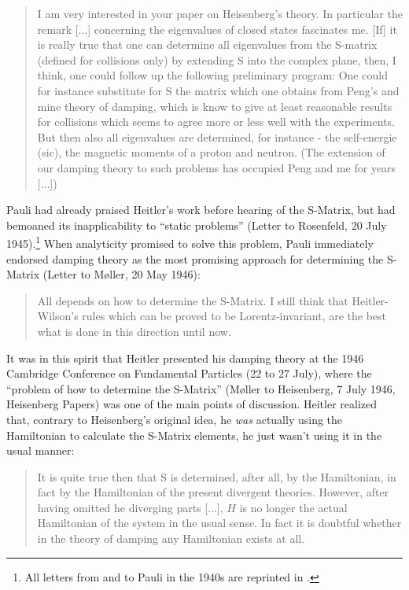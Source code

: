 \documentclass[12pt]{article}
\begin{document}
\begin{quote}
I am very interested in your paper on Heisenberg's theory. In particular the remark [...] concerning the eigenvalues of closed states fascinates me. [If] it is really true that one can determine all eigenvalues from the S-matrix (defined for collisions only) by extending S into the complex plane, then, I think, one could follow up the following preliminary program: One could for instance substitute for S the matrix which one obtains from Peng's and mine theory of damping, which is know to give at least reasonable results for collisions which seems to agree more or less well with the experiments. But then also all eigenvalues are determined, for instance - the self-energie (sic), the magnetic moments of a proton and neutron. (The extension of our damping theory to such problems has occupied Peng and me for years [...])
\end{quote}

Pauli had already praised Heitler's work before hearing of the S-Matrix, but had bemoaned its inapplicability to ``static problems'' (Letter to Rosenfeld, 20 July 1945).\footnote{All letters from and to Pauli in the 1940s are reprinted in \cite{meyenn_1993_wissenschaftlicher}.} When analyticity promised to solve this problem, Pauli immediately endorsed damping theory as the most promising approach for determining the S-Matrix (Letter to M\o ller, 20 May 1946):

\begin{quote}
All depends on how to determine the S-Matrix. I still think that Heitler-Wilson's rules which can be proved to be Lorentz-invariant, are the best what is done in this direction until now.
\end{quote}

It was in this spirit that Heitler presented his damping theory at the 1946 Cambridge Conference on Fundamental Particles (22 to 27 July), where the ``problem of how to determine the S-Matrix'' (M\o ller to Heisenberg, 7 July 1946, Heisenberg Papers) was one of the main points of discussion. Heitler realized that, contrary to Heisenberg's original idea, he \emph{was} actually using the Hamiltonian to calculate the S-Matrix elements, he just wasn't using it in the usual manner:

\begin{quote}
It is quite true then that S is determined, after all, by the Hamiltonian, in fact by the Hamiltonian of the present divergent theories. However, after having omitted he diverging parts [...], $H$ is no longer the actual Hamiltonian of the system in the usual sense. In fact it is doubtful whether in the theory of damping any Hamiltonian exists at all. \citep[p.193]{heitler_1947_the-quantum}
\end{quote}
\end{document}
